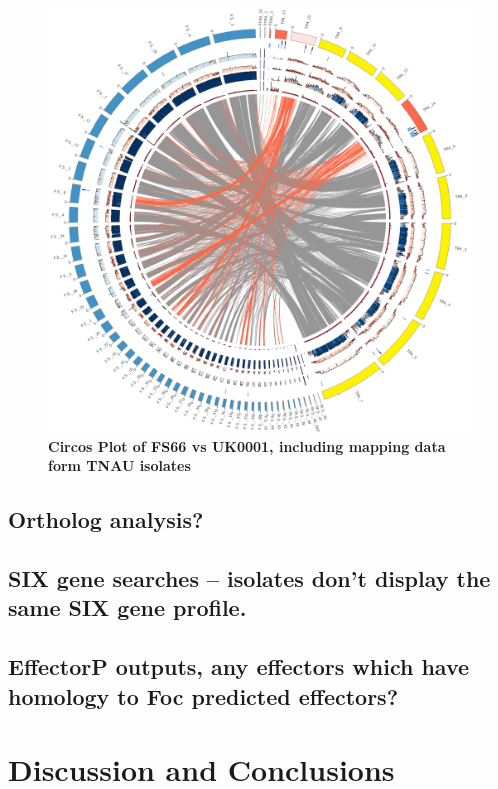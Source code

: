 \begin{figure}[htp!]
  \centering
  \includegraphics[width=15cm]{Figures/circos.png}
  \caption[Circos Plot of FS66 vs UK0001, including mapping data form TNAU isolates]{\textbf{Circos Plot of FS66 vs UK0001, including mapping data form TNAU isolates}}
  \label{TNAUCircos}
\end{figure}


\subsection{Ortholog analysis?}
\subsection{SIX gene searches – isolates don’t display the same SIX gene profile.}
\subsection{EffectorP outputs, any effectors which have homology to Foc predicted effectors?}



\section{Discussion and Conclusions}
